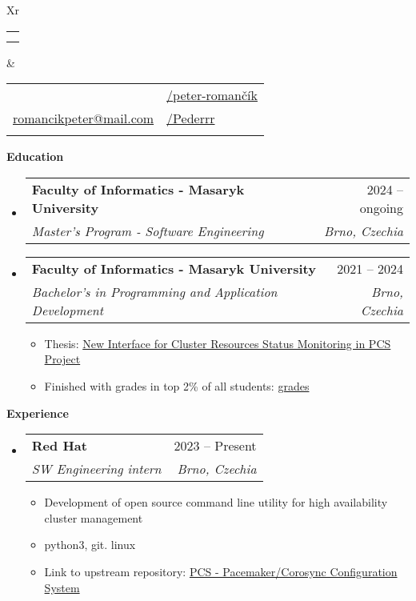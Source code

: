 \documentclass[letterpaper,12pt]{article}[leftmargin=*]
\makeatletter
\def \fullname {Peter Romančík}
\def \subtitle {}
\def \linkedinicon {\faLinkedin}
\def \linkedinlink {https://linkedin.com/in/peter-roman\%C4\%8D\%C3\%ADk-5734132b1/}
\def \linkedintext {/peter-romančík}
\def \phoneicon {\faPhone}
\def \phonetext {+421 917 468 736}
\def \emailicon {\faEnvelope}
\def \emaillink {mailto:romancikpeter@gmail.com}
\def \emailtext {romancikpeter@mail.com}
\def \githubicon {\faGithub}
\def \githublink {https://github.com/Pederrr}
\def \githubtext {/Pederrr}
\def \headertype {\doublecol} %
\def \entryspacing {-0pt}
\def \linkedin {\linkedinicon \hspace{3pt}\href{\linkedinlink}{\linkedintext}}
\def \phone {\phoneicon \hspace{3pt}{ \phonetext}}
\def \email {\emailicon \hspace{3pt}\href{\emaillink}{\emailtext}}
\def \github {\githubicon \hspace{3pt}\href{\githublink}{\githubtext}}
\def \website {\websiteicon \hspace{3pt}\href{\websitelink}{\websitetext}}
\renewcommand{\section}[2]{\vspace{5pt}
  \colorbox{secondary}{\color{white}\raggedbottom\normalsize\textbf{{#1}{\hspace{7pt}#2}}}
}
\newcommand{\resumeEntryStart}{\begin{itemize}[leftmargin=2.5mm]}
\newcommand{\resumeEntryEnd}{\end{itemize}\vspace{\entryspacing}}
\newcommand{\resumeItemListStart}{\begin{itemize}[leftmargin=4.5mm]}
\newcommand{\resumeItemListEnd}{\end{itemize}}
\newcommand{\resumeItem}[1]{
  \item\small{
    {#1 \vspace{-2pt}}
  }
}
\newcommand{\resumeEntryTSDL}[4]{
  \vspace{-1pt}\item[]
    \begin{tabularx}{0.97\textwidth}{X@{\hspace{60pt}}r}
      \textbf{\color{primary}#1} & {\firabook\color{accent}\small#2} \\
      \textit{\color{accent}\small#3} & \textit{\color{accent}\small#4} \\
    \end{tabularx}\vspace{-6pt}
}
\newcommand{\doublecol}[6]{
  \begin{tabularx}{\textwidth}{Xr}
    {
      \begin{tabular}[c]{l}
        \fontsize{35}{45}\selectfont{\color{primary}{{\textbf{\fullname}}}} \\
        {\textit{\subtitle}} %
      \end{tabular}
    } & {
      \begin{tabular}[c]{l@{\hspace{1.5em}}l}
        {\small#4} & {\small#1} \\
        {\small#5} & {\small#2} \\
        {\small#6} & {\small#3}
      \end{tabular}
    }
  \end{tabularx}
}
\newcommand{\singlecol}[6]{
  \begin{tabularx}{\textwidth}{Xr}
    {
      \begin{tabular}[b]{l}
        \fontsize{35}{45}\selectfont{\color{primary}{{\textbf{\fullname}}}} \\
        {\textit{\subtitle}} %
      \end{tabular}
    } & {
      \begin{tabular}[c]{l}
        {\small#1} \\
        {\small#2} \\
        {\small#3} \\
        {\small#4} \\
        {\small#5} \\
        {\small#6}
      \end{tabular}
    }
  \end{tabularx}
}
\makeatother
\begin{document}


\headertype{\linkedin}{\github}{\website}{\phone}{\email}{} %
\vspace{-10pt} %

\def \thesis {\href{https://is.muni.cz/th/bda8v/?lang=en;setlang=en}{New Interface for Cluster Resources Status Monitoring in PCS Project}}
\def \grades {\href{https://is.muni.cz/student/vystavene_znamky?lang=en;studium_osoby=1073312}{grades}}

\section{\faGraduationCap}{Education}

  \resumeEntryStart
    \resumeEntryTSDL
      {Faculty of Informatics - Masaryk University}{2024 -- ongoing}
      {Master's Program - Software Engineering}{Brno, Czechia}
  \resumeEntryEnd
 
  \resumeEntryStart
    \resumeEntryTSDL
      {Faculty of Informatics - Masaryk University}{2021 -- 2024}
      {Bachelor's in Programming and Application Development}{Brno, Czechia}
    \resumeItemListStart
      \resumeItem {Thesis: \thesis}
      \resumeItem {Finished with grades in top 2\% of all students: \grades}
    \resumeItemListEnd
  \resumeEntryEnd

\def \pcs {\href{https://github.com/ClusterLabs/pcs}{PCS - Pacemaker/Corosync Configuration System}}

\section{\faPieChart}{Experience}

  \resumeEntryStart
    \resumeEntryTSDL
      {Red Hat}{2023 -- Present}
      {SW Engineering intern}{Brno, Czechia}
    \resumeItemListStart
      \resumeItem {Development of open source command line utility for high availability cluster management}
      \resumeItem {python3, git. linux}
       \resumeItem {Link to upstream repository: \pcs}
    \resumeItemListEnd
  \resumeEntryEnd
\end{document}
